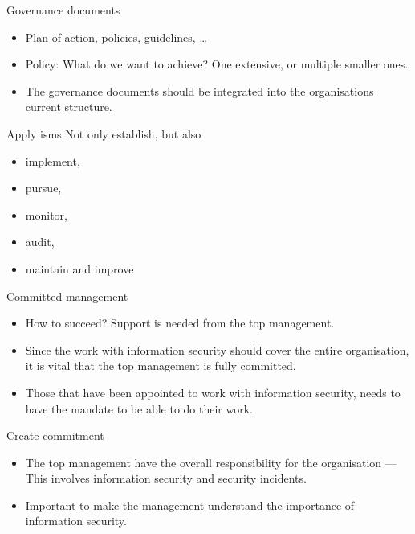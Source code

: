 \documentclass{beamer}
\begin{document}
\begin{frame}{Governance documents}
  \begin{itemize}
    \item Plan of action, policies, guidelines, \dots
    \item Policy: What do we want to achieve?
      One extensive, or multiple smaller ones.
    \item The governance documents should be integrated into the organisations
      current structure.
  \end{itemize}
\end{frame}

\begin{frame}{Apply \ac{isms}}
  Not only establish, but also
  \begin{itemize}
    \item implement,
    \item pursue,
    \item monitor,
    \item audit,
    \item maintain and improve
  \end{itemize}
\end{frame}

\begin{frame}{Committed management}
  \begin{itemize}
    \item How to succeed?
      Support is needed from the top management.

    \item Since the work with information security should cover the entire
      organisation, it is vital that the top management is fully committed.

    \item Those that have been appointed to work with information security,
      needs to have the mandate to be able to do their work.

  \end{itemize}
\end{frame}

\begin{frame}{Create commitment}
  \begin{itemize}
    \item The top management have the overall responsibility for the
      organisation --- This involves information security and security incidents.
    \item Important to make the management understand the importance of
      information security.
  \end{itemize}
\end{frame}
\end{document}
